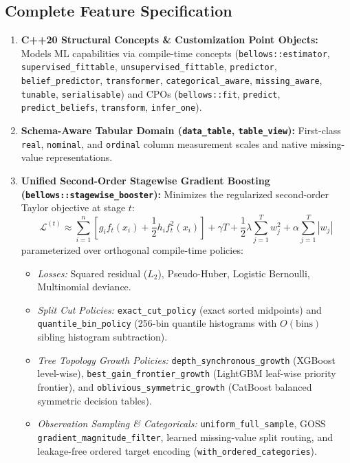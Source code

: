 \documentclass[11pt,a4paper]{article}
\begin{document}
\subsection{Complete Feature Specification}
\begin{enumerate}[leftmargin=1.5em]
  \item \textbf{C++20 Structural Concepts \& Customization Point Objects:} Models ML capabilities via compile-time concepts (\texttt{bellows::estimator}, \texttt{supervised\_fittable}, \texttt{unsupervised\_fittable}, \texttt{predictor}, \texttt{belief\_predictor}, \texttt{transformer}, \texttt{categorical\_aware}, \texttt{missing\_aware}, \texttt{tunable}, \texttt{serialisable}) and CPOs (\texttt{bellows::fit}, \texttt{predict}, \texttt{predict\_beliefs}, \texttt{transform}, \texttt{infer\_one}).
  \item \textbf{Schema-Aware Tabular Domain (\texttt{data\_table}, \texttt{table\_view}):} First-class \texttt{real}, \texttt{nominal}, and \texttt{ordinal} column measurement scales and native missing-value representations.
  \item \textbf{Unified Second-Order Stagewise Gradient Boosting (\texttt{bellows::stagewise\_booster}):}
  Minimizes the regularized second-order Taylor objective at stage $t$:
  \[
    \mathcal{L}^{(t)} \approx \sum_{i=1}^{n} \left[ g_i f_t(x_i) + \frac{1}{2} h_i f_t^2(x_i) \right] + \gamma T + \frac{1}{2}\lambda \sum_{j=1}^{T} w_j^2 + \alpha \sum_{j=1}^{T} |w_j|
  \]
  parameterized over orthogonal compile-time policies:
  \begin{itemize}
    \item \emph{Losses:} Squared residual ($L_2$), Pseudo-Huber, Logistic Bernoulli, Multinomial deviance.
    \item \emph{Split Cut Policies:} \texttt{exact\_cut\_policy} (exact sorted midpoints) and \texttt{quantile\_bin\_policy} (256-bin quantile histograms with $O(\text{bins})$ sibling histogram subtraction).
    \item \emph{Tree Topology Growth Policies:} \texttt{depth\_synchronous\_growth} (XGBoost level-wise), \texttt{best\_gain\_frontier\_growth} (LightGBM leaf-wise priority frontier), and \texttt{oblivious\_symmetric\_growth} (CatBoost balanced symmetric decision tables).
    \item \emph{Observation Sampling \& Categoricals:} \texttt{uniform\_full\_sample}, GOSS \texttt{gradient\_magnitude\_filter}, learned missing-value split routing, and leakage-free ordered target encoding (\texttt{with\_ordered\_categories}).

\end{itemize}
\end{enumerate}
\end{document}

